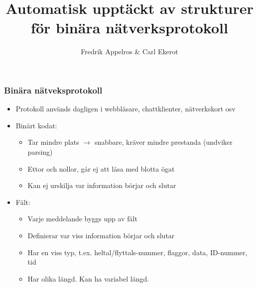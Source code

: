 \documentclass[xetex, 8pt]{beamer}
\title{Automatisk upptäckt av strukturer för binära nätverksprotokoll}
\author{Fredrik Appelros \& Carl Ekerot}
\date
\begin{document}
    \frame{\titlepage}
    
    \begin{frame}
        \frametitle{Binära nätveksprotokoll}
        \begin{itemize}
            \item Protokoll används dagligen i webbläsare, chattklienter, nätverkskort osv
            \item Binärt kodat:
                \begin{itemize}
                    \item Tar mindre plats $\rightarrow$ snabbare, kräver mindre prestanda (undviker parsing)
                    \item Ettor och nollor, går ej att läsa med blotta ögat
                    \item Kan ej urskilja var information börjar och slutar
                \end{itemize}
            \item Fält:
                \begin{itemize}
                    \item Varje meddelande byggs upp av fält
                    \item Definierar var viss information börjar och slutar
                    \item Har en viss typ, t.ex. heltal/flyttals-nummer, flaggor, data, ID-nummer, tid
                    \item Har olika längd. Kan ha variabel längd.
                \end{itemize}
        \end{itemize}
    \end{frame}
\end{document}
